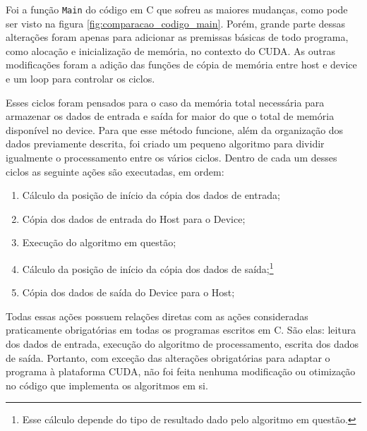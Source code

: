 Foi a função \texttt{Main} do código em C que sofreu as maiores mudanças, como pode ser visto na figura \ref{fig:comparacao_codigo_main}. Porém, grande parte dessas alterações foram apenas para adicionar as premissas básicas de todo programa, como alocação e inicialização de memória, no contexto do CUDA. As outras modificações foram a adição das funções de cópia de memória entre host e device e um loop para controlar os ciclos.

Esses ciclos foram pensados para o caso da memória total necessária para armazenar os dados de entrada e saída for maior do que o total de memória disponível no device. Para que esse método funcione, além da organização dos dados previamente descrita, foi criado um pequeno algoritmo para dividir igualmente o processamento entre os vários ciclos. Dentro de cada um desses ciclos as seguinte ações são executadas, em ordem:

\begin{enumerate}
\item Cálculo da posição de início da cópia dos dados de entrada;
\item Cópia dos dados de entrada do Host para o Device;
\item Execução do algoritmo em questão;
\item Cálculo da posição de início da cópia dos dados de saída;\footnote{Esse cálculo depende do tipo de resultado dado pelo algoritmo em questão.}
\item Cópia dos dados de saída do Device para o Host;
\end{enumerate}

Todas essas ações possuem relações diretas com as ações consideradas praticamente obrigatórias em todas os programas escritos em C. São elas: leitura dos dados de entrada, execução do algoritmo de processamento, escrita dos dados de saída. Portanto, com exceção das alterações obrigatórias para adaptar o programa à plataforma CUDA, não foi feita nenhuma modificação ou otimização no código que implementa os algoritmos em si.

